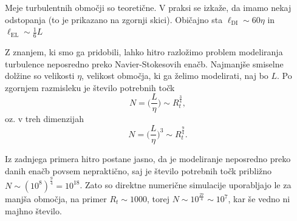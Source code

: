 \documentclass[mat2, tisk]{fmfdelo}
\begin{document}

\begin{opomba}
Meje turbulentnih območji so teoretične. V praksi se izkaže, da imamo nekaj 
odstopanja (to je prikazano na zgornji skici). Običajno sta
$\ell_{\text{DI}} \sim 60\eta$ in $\ell_{\text{EL}} \sim \frac{1}{6} L$
\end{opomba}


Z znanjem, ki smo ga pridobili, lahko hitro razložimo problem modeliranja turbulence
neposredno preko Navier-Stokesovih enačb. Najmanjše smiselne dolžine so velikosti $\eta$,
velikost območja, ki ga želimo modelirati, naj bo $L$. Po zgornjem razmisleku je število potrebnih točk 
$$
N = \Big( \frac{L}{\eta} \Big) \sim R_t^\frac{3}{4},
$$
oz. v treh dimenzijah 
$$
N = \Big( \frac{L}{\eta} \Big)^3 \sim R_t^\frac{9}{4}.
$$


Iz zadnjega primera hitro postane jasno, da je modeliranje neposredno preko danih enačb 
povsem nepraktično, saj je število potrebnih točk približno $N \sim (10^8)^\frac{9}{4}
= 10^{18}$. Zato so direktne numerične simulacije uporabljajo le za manjša območja, 
na primer $R_t \sim 1000$, torej $N \sim 10^\frac{27}{4} \sim 10^7$, kar še vedno ni majhno število. 
\end{document}

